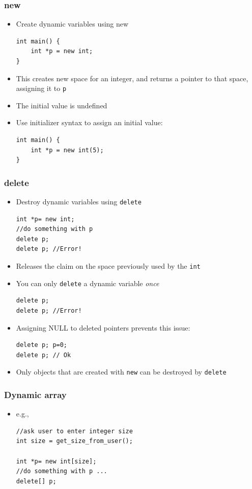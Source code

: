 \subsubsection{new}
\begin{itemize}
	\item Create dynamic variables using new
\begin{lstlisting}[style=C++]
int main() {
	int *p = new int;
}
\end{lstlisting}
	\item This creates new space for an integer, and returns a pointer to that space, assigning it to \lstinline[style=C++]{p}
	\item The initial value is undefined
	\item Use initializer syntax to assign an initial value:
\begin{lstlisting}[style=C++]
int main() {
	int *p = new int(5);
}
\end{lstlisting}
\end{itemize}

\subsubsection{delete}
\begin{itemize}
	\item Destroy dynamic variables using \lstinline[style=C++]{delete}
\begin{lstlisting}[style=C++]
int *p= new int;
//do something with p
delete p;
delete p; //Error!
\end{lstlisting}
	\item Releases the claim on the space previously used by the \lstinline[style=C++]{int}
	\item You can only \lstinline[style=C++]{delete} a dynamic variable \textit{once}
\begin{lstlisting}[style=C++]
delete p;
delete p; //Error!
\end{lstlisting}
	\item Assigning NULL to deleted pointers prevents this issue:
\begin{lstlisting}[style=C++]
delete p; p=0;
delete p; // Ok
\end{lstlisting}
	\item Only objects that are created with \lstinline[style=C++]{new} can be destroyed by \lstinline[style=C++]{delete}
\end{itemize}

\subsubsection{Dynamic array}
\begin{itemize}
	\item e.g.,
\begin{lstlisting}
//ask user to enter integer size
int size = get_size_from_user();

int *p= new int[size];
//do something with p ...
delete[] p;
\end{lstlisting}
\end{itemize}

